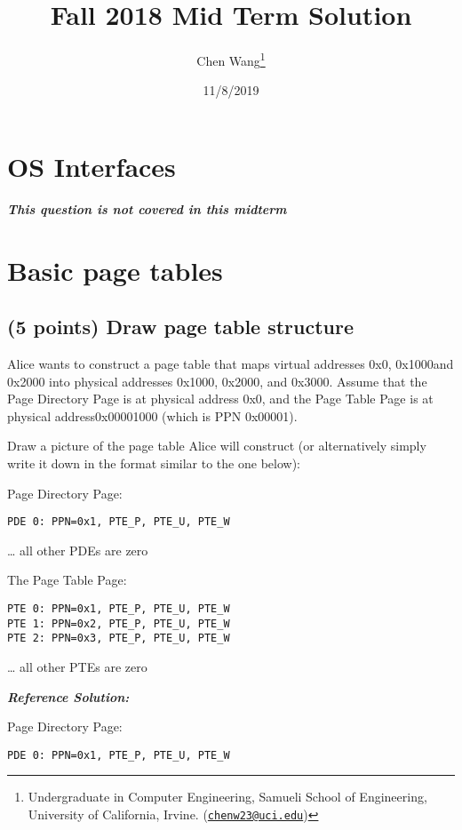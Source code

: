 \documentclass[]{article}
\title{Fall 2018 Mid Term Solution}
\author{Chen Wang\footnote{Undergraduate in Computer Engineering, Samueli School
  of Engineering, University of California, Irvine.
  (\href{mailto:chenw23@uci.edu}{\nolinkurl{chenw23@uci.edu}})}}
\date{11/8/2019}
\begin{document}
\maketitle

{
\setcounter{tocdepth}{3}
\tableofcontents
}
\hypertarget{os-interfaces}{%
\section{OS Interfaces}\label{os-interfaces}}

\textbf{\emph{This question is not covered in this midterm}}

\hypertarget{basic-page-tables}{%
\section{Basic page tables}\label{basic-page-tables}}

\hypertarget{points-draw-page-table-structure}{%
\subsection{(5 points) Draw page table
structure}\label{points-draw-page-table-structure}}

Alice wants to construct a page table that maps virtual addresses 0x0,
0x1000and 0x2000 into physical addresses 0x1000, 0x2000, and 0x3000.
Assume that the Page Directory Page is at physical address 0x0, and the
Page Table Page is at physical address0x00001000 (which is PPN 0x00001).

Draw a picture of the page table Alice will construct (or alternatively
simply write it down in the format similar to the one below):

Page Directory Page:

\texttt{PDE\ 0:\ PPN=0x1,\ PTE\_P,\ PTE\_U,\ PTE\_W}

\ldots{} all other PDEs are zero

The Page Table Page:

\begin{verbatim}
PTE 0: PPN=0x1, PTE_P, PTE_U, PTE_W
PTE 1: PPN=0x2, PTE_P, PTE_U, PTE_W
PTE 2: PPN=0x3, PTE_P, PTE_U, PTE_W
\end{verbatim}

\ldots{} all other PTEs are zero

\textbf{\emph{Reference Solution:}}

Page Directory Page:

\texttt{PDE\ 0:\ PPN=0x1,\ PTE\_P,\ PTE\_U,\ PTE\_W}
\end{document}
